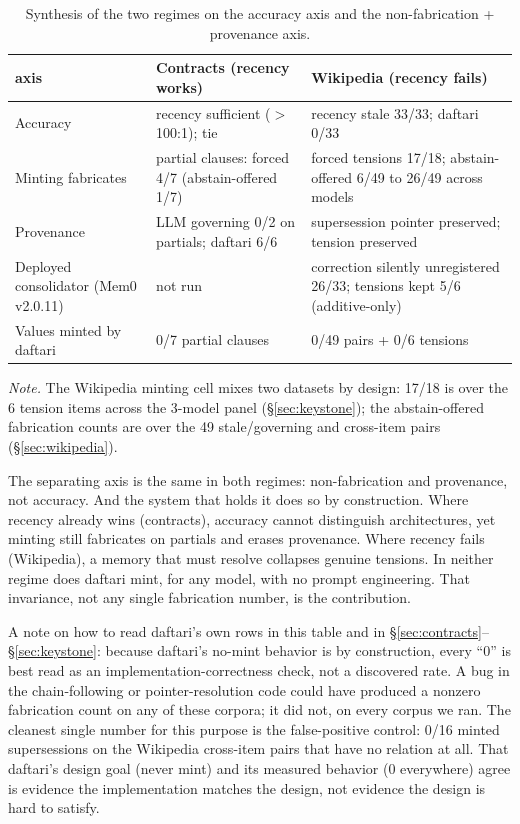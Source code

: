 \documentclass[11pt]{article}
\begin{document}
\begin{table}[t]
\centering
\small
\begin{tabular}{p{3.1cm}p{5.4cm}p{5.4cm}}
\toprule
axis & Contracts (recency works) & Wikipedia (recency fails) \\
\midrule
Accuracy & recency sufficient ($>$100:1); tie & recency stale 33/33; daftari 0/33 \\
Minting fabricates & partial clauses: forced 4/7 (abstain-offered 1/7) & forced tensions 17/18; abstain-offered 6/49 to 26/49 across models \\
Provenance & LLM governing 0/2 on partials; daftari 6/6 & supersession pointer preserved; tension preserved \\
Deployed consolidator (Mem0 v2.0.11) & not run & correction silently unregistered 26/33; tensions kept 5/6 (additive-only) \\
Values minted by daftari & 0/7 partial clauses & 0/49 pairs + 0/6 tensions \\
\bottomrule
\end{tabular}
\caption{Synthesis of the two regimes on the accuracy axis and the non-fabrication +
provenance axis.}
\label{tab:synthesis}
\end{table}

\begin{center}
\begin{minipage}{0.9\textwidth}
\small
\emph{Note.} The Wikipedia minting cell mixes two datasets by design: 17/18 is over the 6 tension items
across the 3-model panel (\S\ref{sec:keystone}); the abstain-offered fabrication counts are over the 49
stale/governing and cross-item pairs (\S\ref{sec:wikipedia}).
\end{minipage}
\end{center}

The separating axis is the same in both regimes: non-fabrication and provenance, not
accuracy. And the system that holds it does so by construction. Where recency already
wins (contracts), accuracy cannot distinguish architectures, yet minting still fabricates on
partials and erases provenance. Where recency fails (Wikipedia), a memory that must resolve
collapses genuine tensions. In neither regime does daftari mint, for any model, with no
prompt engineering. That invariance, not any single fabrication number, is the
contribution.

A note on how to read daftari's own rows in this table and in \S\ref{sec:contracts}--\S\ref{sec:keystone}: because daftari's no-mint
behavior is by construction, every ``0'' is best read as an implementation-correctness
check, not a discovered rate. A bug in the chain-following or pointer-resolution code could
have produced a nonzero fabrication count on any of these corpora; it did not, on every corpus
we ran. The cleanest single number for this purpose is the false-positive control: 0/16
minted supersessions on the Wikipedia cross-item pairs that have no relation at all. That
daftari's design goal (never mint) and its measured behavior (0 everywhere) agree is evidence
the implementation matches the design, not evidence the design is hard to satisfy.
\end{document}
